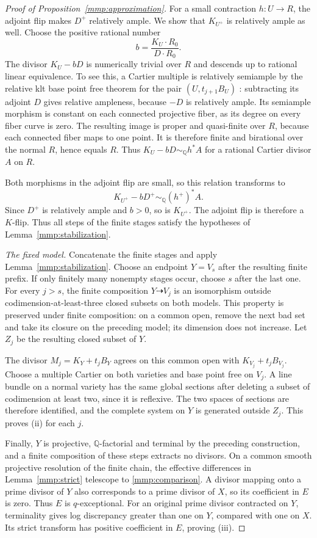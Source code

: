 \begin{proof}[Proof of Proposition~\ref{mmp:approximation}]
For a small contraction $h:U\to R$, the adjoint flip makes $D^+$
relatively ample.  We show that $K_{U^+}$ is relatively ample as
well.  Choose the positive rational
number
\[
 b=\frac{K_U\cdot R_0}{D\cdot R_0}.
\]
The divisor $K_U-bD$ is numerically trivial over $R$ and descends
up to rational linear equivalence.  To see this, a Cartier
multiple is relatively semiample by the relative klt base point
free theorem for the pair $(U,t_{j+1}B_U)$
\cite[Theorem~3.24]{KM98}: subtracting its adjoint $D$ gives
relative ampleness, because $-D$ is relatively ample.  Its
semiample morphism is constant on each connected projective fiber,
as its degree on every fiber curve is zero.  The resulting image
is proper and quasi-finite over $R$, because each connected fiber
maps to one point. It is therefore finite and birational over the
normal $R$, hence equals $R$.
Thus $K_U-bD\sim_{\mathbb Q}h^*A$ for a rational Cartier divisor
$A$ on $R$.

Both morphisms in the adjoint flip are small, so this relation
transforms to
\[
 K_{U^+}-bD^+\sim_{\mathbb Q}(h^+)^*A.
\]
Since $D^+$ is relatively ample and $b>0$, so is $K_{U^+}$.
The adjoint flip is therefore a $K$-flip.  Thus all steps of the
finite stages satisfy the hypotheses of
Lemma~\ref{mmp:stabilization}.

\smallskip\noindent
\emph{The fixed model.}
Concatenate the finite stages and apply
Lemma~\ref{mmp:stabilization}.  Choose an endpoint $Y=V_s$ after
the resulting finite prefix.  If only finitely many nonempty stages
occur, choose $s$ after the last one.  For every $j>s$, the finite
composition $Y\dashrightarrow V_j$ is an isomorphism outside
codimension-at-least-three closed subsets on both models.
This property is preserved under finite composition: on a common
open, remove the next bad set and take its closure on the preceding
model; its dimension does not increase.  Let $Z_j$ be the resulting
closed subset of $Y$.

The divisor $M_j=K_Y+t_jB_Y$ agrees on this common open with
$K_{V_j}+t_jB_{V_j}$.  Choose a multiple Cartier on both varieties
and base point free on $V_j$.  A line bundle on a normal variety
has the same global sections after deleting a subset of codimension
at least two, since it is reflexive.  The two spaces of sections
are therefore identified, and the complete system on $Y$ is
generated outside $Z_j$.  This proves \textup{(ii)} for each $j$.

Finally, $Y$ is projective, $\mathbb Q$-factorial and terminal by
the preceding construction, and a finite composition of these
steps extracts no divisors.  On a common smooth projective
resolution of the finite chain, the effective differences in
Lemma~\ref{mmp:strict} telescope to \eqref{mmp:comparison}.
A divisor mapping onto a prime divisor of $Y$ also corresponds to
a prime divisor of $X$, so its coefficient in $E$ is zero.
Thus $E$ is $q$-exceptional.  For an original prime divisor
contracted on $Y$, terminality gives log discrepancy greater than
one on $Y$, compared with one on $X$.  Its strict transform has
positive coefficient in $E$, proving \textup{(iii)}.
\end{proof}
